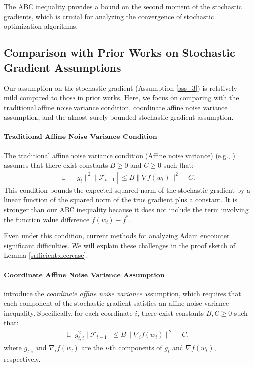 \documentclass{article} %
\begin{document}
The ABC inequality provides a bound on the second moment of the stochastic gradients, which is crucial for analyzing the convergence of stochastic optimization algorithms.

\subsection{Comparison with Prior Works on Stochastic Gradient Assumptions}
Our assumption on the stochastic gradient (Assumption \ref{ass_3}) is relatively mild compared to those in prior works. Here, we focus on comparing with the traditional affine noise variance condition, coordinate affine noise variance assumption, and the almost surely bounded stochastic gradient assumption.

\paragraph{Traditional Affine Noise Variance Condition}
The traditional affine noise variance condition (Affine noise variance) (e.g., \cite{bottou2018optimization,nguyen2018sgd}) assumes that there exist constants \( B \geq 0 \) and \( C \geq 0 \) such that:
\begin{align}\label{weak growth}
\mathbb{E}[\|g_t\|^2 \mid \mathscr{F}_{t-1}] \leq B \|\nabla f(w_t)\|^2 + C.
\end{align}
This condition bounds the expected squared norm of the stochastic gradient by a linear function of the squared norm of the true gradient plus a constant. It is stronger than our ABC inequality because it does not include the term involving the function value difference \( f(w_t) - f^* \).

Even under this condition, current methods for analyzing Adam encounter significant difficulties. We will explain these challenges in the proof sketch of Lemma \ref{sufficient:decrease}.

\paragraph{Coordinate Affine Noise Variance Assumption}

\citet{wang2024closing} introduce the \emph{coordinate affine noise variance} assumption, which requires that each component of the stochastic gradient satisfies an affine noise variance inequality. Specifically, for each coordinate \( i \), there exist constants \( B, C \geq 0 \) such that:
\begin{align}\label{weak growth1}
\mathbb{E}[ g^{2}_{t,i} \mid \mathscr{F}_{t-1} ] \leq  B\|\nabla_i f(w_t)\|^2 + C,
\end{align}
where \( g_{t,i} \) and \( \nabla_i f(w_t) \) are the \( i \)-th components of \( g_t \) and \( \nabla f(w_t) \), respectively.
\end{document}
